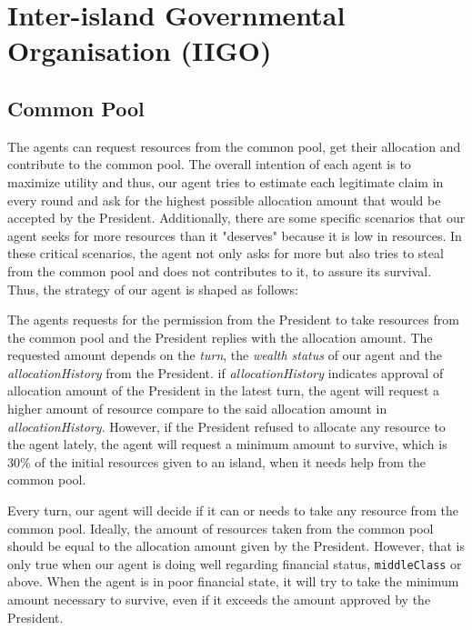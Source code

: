 \section{Inter-island Governmental Organisation (IIGO)}
\subsection{Common Pool}

The agents can request resources from the common pool, get their allocation and contribute to the common pool. The overall intention of each agent is to maximize utility and thus, our agent tries to estimate each legitimate claim in every round and ask for the highest possible allocation amount that would be accepted by the President. Additionally, there are some specific scenarios that our agent seeks for more resources than it "deserves" because it is low in resources. In these critical scenarios, the agent not only asks for more but also tries to steal from the common pool and does not contributes to it, to assure its survival. Thus, the strategy of our agent is shaped as follows: \newline

The agents requests for the permission from the President to take resources from the common pool and the President replies with the allocation amount. The requested amount depends on the \textit{turn}, the \textit{wealth status} of our agent and the \textit{allocationHistory} from the President. if \textit{allocationHistory} indicates approval of allocation amount of the President in the latest turn, the agent will request a higher amount of resource compare to the said allocation amount in \textit{allocationHistory}. However, if the President refused to allocate any resource to the agent lately, the agent will request a minimum amount to survive, which is $30\%$ of the initial resources given to an island, when it needs help from the common pool.


Every turn, our agent will decide if it can or needs to take any resource from the common pool. Ideally, the amount of resources taken from the common pool should be equal to the allocation amount given by the President. However, that is only true when our agent is doing well regarding financial status, \texttt{middleClass} or above. When the agent is in poor financial state, it will try to take the minimum amount necessary to survive, even if it exceeds the amount approved by the President. \newline


